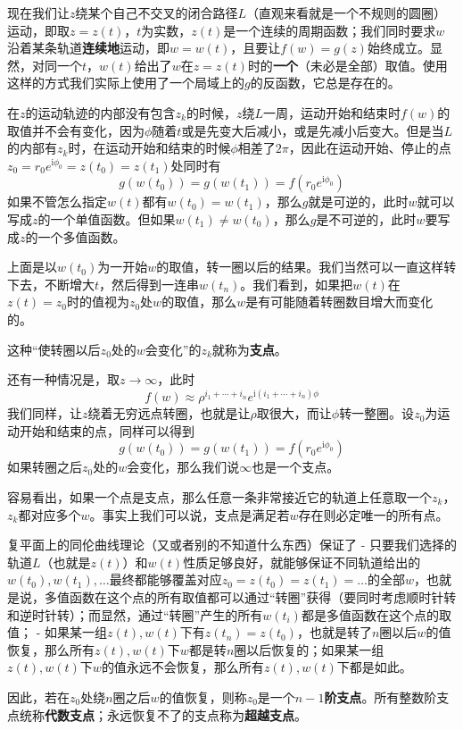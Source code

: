 现在我们让$z$绕某个自己不交叉的闭合路径$L$（直观来看就是一个不规则的圆圈）运动，即取$z=z(t)$，$t$为实数，$z(t)$是一个连续的周期函数；我们同时要求$w$沿着某条轨道\textbf{连续地}运动，即$w=w(t)$，且要让$f(w)=g(z)$始终成立。显然，对同一个$t$，$w(t)$给出了$w$在$z=z(t)$时的\textbf{一个}（未必是全部）取值。使用这样的方式我们实际上使用了一个局域上的$g$的反函数，它总是存在的。

在$z$的运动轨迹的内部没有包含$z_k$的时候，$z$绕$L$一周，运动开始和结束时$f(w)$的取值并不会有变化，因为$\phi$随着$t$或是先变大后减小，或是先减小后变大。但是当$L$的内部有$z_k$时，在运动开始和结束的时候$\phi$相差了$2\pi$，因此在运动开始、停止的点$z_0 = r_0 e^{\mathrm{i}\phi_0}=z(t_0)=z(t_1)$处同时有
\[
g(w(t_0)) = g(w(t_1)) = f(r_0 e^{\mathrm{i}\phi_0})
\]
如果不管怎么指定$w(t)$都有$w(t_0)=w(t_1)$，那么$g$就是可逆的，此时$w$就可以写成$z$的一个单值函数。但如果$w(t_1) \neq w(t_0)$，那么$g$是不可逆的，此时$w$要写成$z$的一个多值函数。

上面是以$w(t_0)$为一开始$w$的取值，转一圈以后的结果。我们当然可以一直这样转下去，不断增大$t$，然后得到一连串$w(t_n)$。我们看到，如果把$w(t)$在$z(t)=z_0$时的值视为$z_0$处$w$的取值，那么$w$是有可能随着转圈数目增大而变化的。

这种``使转圈以后$z_0$处的$w$会变化''的$z_k$就称为\textbf{支点}。

还有一种情况是，取$z \rightarrow \infty$，此时 \[
f(w) \approx \rho^{i_1 + \cdots + i_n} e^{\mathrm{i}(i_1 + \cdots + i_n)\phi}
\]
我们同样，让$z$绕着无穷远点转圈，也就是让$\rho$取很大，而让$\phi$转一整圈。设$z_0$为运动开始和结束的点，同样可以得到
\[
g(w(t_0)) = g(w(t_1)) = f(r_0 e^{\mathrm{i}\phi_0})
\]
如果转圈之后$z_0$处的$w$会变化，那么我们说$\infty$也是一个支点。

容易看出，如果一个点是支点，那么任意一条非常接近它的轨道上任意取一个$z_k$，$z_k$都对应多个$w$。事实上我们可以说，支点是满足若$w$存在则必定唯一的所有点。

复平面上的同伦曲线理论（又或者别的不知道什么东西）保证了 -
只要我们选择的轨道$L$（也就是$z(t)$）和$w(t)$性质足够良好，就能够保证不同轨道给出的$w(t_0), w(t_1), \ldots$最终都能够覆盖对应$z_0=z(t_0)=z(t_1)=\ldots$的全部$w$，也就是说，多值函数在这个点的所有取值都可以通过``转圈''获得（要同时考虑顺时针转和逆时针转）；而显然，通过``转圈''产生的所有$w(t_i)$都是多值函数在这个点的取值；
-
如果某一组$z(t), w(t)$下有$z(t_n)=z(t_0)$，也就是转了$n$圈以后$w$的值恢复，那么所有$z(t), w(t)$下$w$都是转$n$圈以后恢复的；如果某一组$z(t), w(t)$下$w$的值永远不会恢复，那么所有$z(t), w(t)$下都是如此。

因此，若在$z_0$处绕$n$圈之后$w$的值恢复，则称$z_0$是一个$n-1$\textbf{阶支点}。所有整数阶支点统称\textbf{代数支点}；永远恢复不了的支点称为\textbf{超越支点}。

